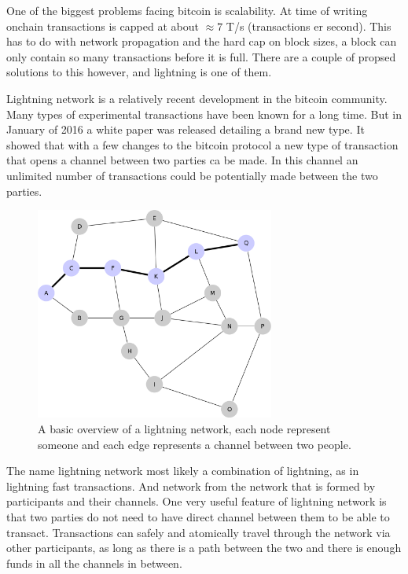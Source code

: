 
One of the biggest problems facing bitcoin is scalability. At time of writing
onchain transactions is capped at about $\approx 7$ T/s (transactions er second).\cite{scaling}
This has to do with network propagation and the hard cap on block sizes, a block
can only contain so many transactions before it is full. There are a couple of
propsed solutions to this however, and lightning is one of them.

Lightning network is a relatively recent development in the bitcoin community.
Many types of experimental transactions have been known for a long time. But in
January of 2016 a white paper was released detailing a brand new type.\cite{lightningnetwork_2019}
It showed that with a few changes to the bitcoin protocol a new type of
transaction that opens a channel between two parties ca be made. In this channel
an unlimited number of transactions could be potentially made between the two
parties. \cite{lightningnetwork_2019}

\begin{figure}[H]
	\centering
	\includegraphics[width=0.70\textwidth]{introduction/images/mesh_network.png}
	\caption{A basic overview of a lightning network, each node represent someone
	and each edge represents a channel between two people.}
	\label{fig:blockchain3}
\end{figure}

The name lightning network most likely a combination of lightning, as in
lightning fast transactions. And network from the network that is formed by
participants and their channels. One very useful feature of lightning network
is that two parties do not need to have direct channel between them to be able
to transact. Transactions can safely and atomically travel through the network
via other participants, as long as there is a path between the two and there is
enough funds in all the channels in between.\cite{lightningnetwork_2019}
